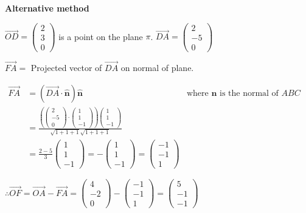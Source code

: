 \begin{enumerate}
\textbf{Alternative method }

$\overrightarrow{OD}=\left(\begin{matrix}2\\
3\\
0
\end{matrix}\right)$ is a point on the plane $\pi$. $\overrightarrow{DA}=\left(\begin{matrix}2\\
-5\\
0
\end{matrix}\right)$ 

$\overrightarrow{FA}=$ Projected vector of $\overrightarrow{DA}$
on normal of plane. 

$\begin{array}{ccc}
\overrightarrow{FA} & =\left(\overrightarrow{DA}\cdot\mathbf{\hat{n}}\right)\mathbf{\hat{n}} & \text{where }\mathbf{n}\text{ is the normal of }ABC\\
 & =\frac{\left(\left(\begin{matrix}2\\
-5\\
0
\end{matrix}\right)\cdot\left(\begin{matrix}1\\
1\\
-1
\end{matrix}\right)\right)\left(\begin{matrix}1\\
1\\
-1
\end{matrix}\right)}{\sqrt{1+1+1}\sqrt{1+1+1}}\\
 & =\frac{2-5}{3}\left(\begin{matrix}1\\
1\\
-1
\end{matrix}\right)=-\left(\begin{matrix}1\\
1\\
-1
\end{matrix}\right)=\left(\begin{matrix}-1\\
-1\\
1
\end{matrix}\right)
\end{array}$

$\therefore\overrightarrow{OF}=\overrightarrow{OA}-\overrightarrow{FA}=\left(\begin{matrix}4\\
-2\\
0
\end{matrix}\right)-\left(\begin{matrix}-1\\
-1\\
1
\end{matrix}\right)=\left(\begin{matrix}5\\
-1\\
-1
\end{matrix}\right)$ 


\end{enumerate}
